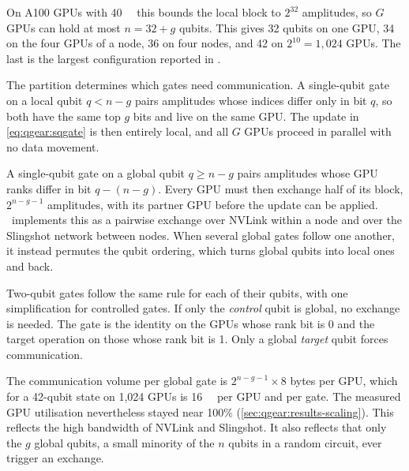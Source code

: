 On A100 GPUs with \SI{40}{\giga\byte} this bounds the local block to $2^{32}$ amplitudes, so $G$ GPUs can hold at most $n = 32+g$ qubits. This gives 32 qubits on one GPU, 34 on the four GPUs of a node, 36 on four nodes, and 42 on $2^{10}=1,024$ GPUs. The last is the largest configuration reported in \cite{guo2025qgear}.

The partition determines which gates need communication. A single-qubit gate on a local qubit $q<n-g$ pairs amplitudes whose indices differ only in bit $q$, so both have the same top $g$ bits and live on the same GPU. The update in \cref{eq:qgear:sqgate} is then entirely local, and all $G$ GPUs proceed in parallel with no data movement.

A single-qubit gate on a global qubit $q\geq n-g$ pairs amplitudes whose GPU ranks differ in bit $q-(n-g)$. Every GPU must then exchange half of its block, $2^{n-g-1}$ amplitudes, with its partner GPU before the update can be applied. \cudaq\ implements this as a pairwise exchange over NVLink within a node and over the Slingshot network between nodes. When several global gates follow one another, it instead permutes the qubit ordering, which turns global qubits into local ones and back.

Two-qubit gates follow the same rule for each of their qubits, with one simplification for controlled gates. If only the \emph{control} qubit is global, no exchange is needed. The gate is the identity on the GPUs whose rank bit is 0 and the target operation on those whose rank bit is 1. Only a global \emph{target} qubit forces communication.

The communication volume per global gate is $2^{n-g-1}\times 8$ bytes per GPU, which for a 42-qubit state on 1,024 GPUs is \SI{16}{\giga\byte} per GPU and per gate. The measured GPU utilisation nevertheless stayed near 100\% (\cref{sec:qgear:results-scaling}). This reflects the high bandwidth of NVLink and Slingshot. It also reflects that only the $g$ global qubits, a small minority of the $n$ qubits in a random circuit, ever trigger an exchange.

